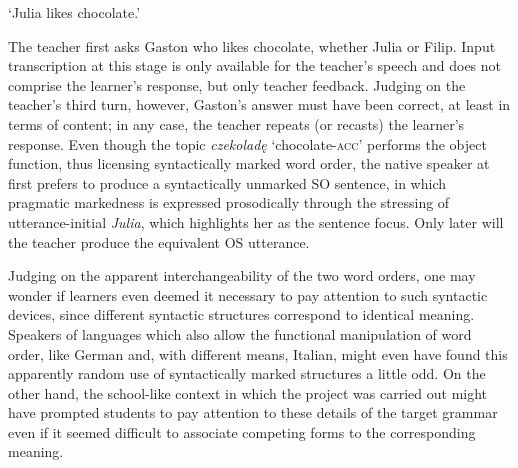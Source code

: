 \ea%
    \label{ex:08:2}
    \glt    ‘Julia likes chocolate.’
    \z
\z

The teacher first asks Gaston who likes chocolate, whether Julia or Filip. Input transcription at this stage is only available for the teacher's speech and does not comprise the learner's response, but only teacher feedback. Judging on the teacher's third turn, however, Gaston's answer must have been correct, at least in terms of content; in any case, the teacher repeats (or recasts) the learner’s response. Even though the topic \textit{czekoladę} ‘chocolate-\textsc{acc’} performs the object function, thus licensing syntactically marked word order, the native speaker at first prefers to produce a syntactically unmarked SO sentence, in which pragmatic markedness is expressed prosodically through the stressing of utterance-initial \textit{Julia}, which highlights her as the sentence focus. Only later will the teacher produce the equivalent OS utterance.

Judging on the apparent interchangeability of the two word orders, one may wonder if learners even deemed it necessary to pay attention to such syntactic devices, since different syntactic structures correspond to identical meaning. Speakers of languages which also allow the functional manipulation of word order, like German and, with different means, Italian, might even have found this apparently random use of syntactically marked structures a little odd. On the other hand, the school-like context in which the project was carried out might have prompted students to pay attention to these details of the target grammar even if it seemed difficult to associate competing forms to the corresponding meaning.


